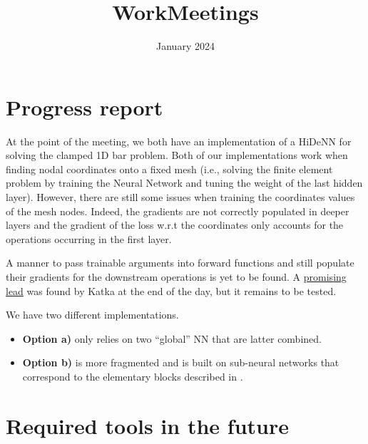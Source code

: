 \documentclass{article}
\title{WorkMeetings}
\date{January 2024}
\begin{document}
\maketitle


\section{Progress report}
At the point of the meeting, we both have an implementation of a HiDeNN for solving the clamped 1D bar problem. Both of our implementations work when finding nodal coordinates onto a fixed mesh (i.e., solving the finite element problem by training the Neural Network and tuning the weight of the last hidden layer). However, there are still some issues when training the coordinates values of the mesh nodes. Indeed, the gradients are not correctly populated in deeper layers and the gradient of the loss w.r.t the coordinates only accounts for the operations occurring in the first layer. 

A manner to pass trainable arguments into forward functions and still populate their gradients for the downstream operations is yet to be found. A \href{https://discuss.pytorch.org/t/reusing-altered-parameters-in-more-than-one-layer/158106/2}{promising lead} was found by Katka at the end of the day, but it remains to be tested.

We have two different implementations. 
\begin{itemize}
    \item[\faCodeBranch] \textbf{Option a)} only relies on two ``global'' NN that are latter combined. 
    \item[\faCodeBranch] \textbf{Option b)} is more fragmented and is built on sub-neural networks that correspond to the elementary blocks described in \cite{zhang_hierarchical_2021}.
\end{itemize}

\section{Required tools in the future}
\end{document}
